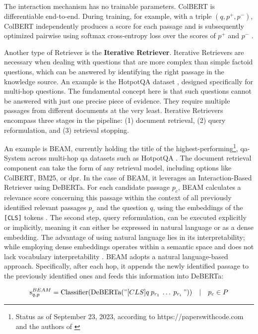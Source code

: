The interaction mechanism has no trainable parameters. ColBERT is differentiable end-to-end. During training, for example, with a triple $(q, p^+, p^-)$, ColBERT independently produces a score for each passage and is subsequently optimized pairwise using softmax cross-entropy loss over the scores of $p^+$ and $p^-$ \cite{khattab_colbert_2020}.

Another type of Retriever is the \textbf{Iterative Retriever}. Iterative Retrievers are necessary when dealing with questions that are more complex than simple factoid questions, which can be answered by identifying the right passage in the knowledge source. An example is the HotpotQA dataset \cite{yang_hotpotqa_2018}, designed specifically for multi-hop questions. The fundamental concept here is that such questions cannot be answered with just one precise piece of evidence. They require multiple passages from different documents at the very least. Iterative Retrievers encompass three stages in the pipeline: (1) document retrieval, (2) query reformulation, and (3) retrieval stopping.

An example is BEAM, currently holding the title of the highest-performing\footnote{Status as of September 23, 2023, according to https://paperswithcode.com and the authors of \cite{zhang_beam_2023}}, \gls{qa}-System across multi-hop \gls{qa} datasets such as HotpotQA \cite{zhang_beam_2023}. The document retrieval component can take the form of any retrieval model, including options like ColBERT, BM25, or \gls{dpr}. In the case of BEAM, it leverages an Interaction-Based Retriever using DeBERTa. For each candidate passage $p_c$, BEAM calculates a relevance score concerning this passage within the context of all previously identified relevant passages $p_r$ and the question $q$, using the embeddings of the \verb|[CLS]| tokens \cite{he_deberta_2020}. The second step, query reformulation, can be executed explicitly or implicitly, meaning it can either be expressed in natural language or as a dense embedding. The advantage of using natural language lies in its interpretability; while employing dense embeddings operates within a semantic space and does not lack vocabulary interpretability \cite{zhu_retrieving_2021}. BEAM adopts a natural language-based approach. Specifically, after each hop, it appends the newly identified passage to the previously identified ones and feeds this information into DeBERTa:

\begin{equation}
    \text{s}_{q, p}^{BEAM} = \text{Classifier}(\text{DeBERTa}("[CLS] q \: p_{r_1} \: \ldots \: p_{r_i} \: ")) \quad | \quad p_{c} \in P
\end{equation}

